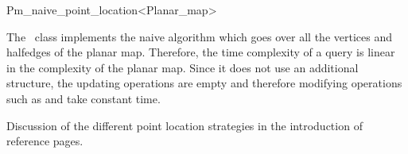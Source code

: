 
\ccRefPageBegin


\renewcommand{\ccRefPageBegin}{\begin{ccAdvanced}}
\renewcommand{\ccRefPageEnd}{\end{ccAdvanced}}

\begin{ccRefClass}{Pm_naive_point_location<Planar_map>}
\label{PL_sec:naive}

The \ccRefName\ class 
implements the naive algorithm which goes over all the vertices and halfedges
of the planar map. Therefore, the time complexity of a query is linear in
the complexity of the planar map. Since it does not use an additional
structure, the updating operations are empty and therefore 
modifying operations such as 
 and  take constant time.


\ccIsModel

\ccInheritsFrom

\ccSeeAlso
   Discussion of the different point location strategies in the introduction
of  reference pages.

\end{ccRefClass}
\renewcommand{\ccRefPageBegin}{}
\renewcommand{\ccRefPageEnd}{}


\ccRefPageEnd
